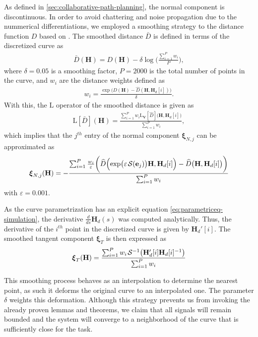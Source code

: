 As defined in \cref{sec:collaborative-path-planning}, the normal component is discontinuous. In order to avoid chattering and noise propagation due to the nummerical differentiations, we employed a smoothing strategy to the distance function $D$ based on \citet{viniciusmooth}. The smoothed distance $\bar{D}$ is defined in terms of the discretized curve as
\begin{align}
    \bar{D}(\mathbf{H}) = D(\mathbf{H}) - \delta\log\biggl(\frac{\sum_{i=1}^{P}w_i}{P}\biggr),
\end{align}
where $\delta=0.05$ is a smoothing factor, $P=\num{2000}$ is the total number of points in the curve, and $w_i$ are the distance weights defined as
\begin{align}
    w_i = \frac{\exp\bigl(D(\mathbf{H}) - \widehat{D}(\mathbf{H}, \mathbf{H}_d[i])\bigr)}{\delta}.
\end{align}
With this, the $\text{L}$ operator of the smoothed distance is given as
\begin{align}
    \text{L}[\bar{D}](\mathbf{H}) = \frac{\sum_{i=1}^{P}w_i\text{L}_\mathbf{V}[\widehat{D}]\bigl(\mathbf{H}, \mathbf{H}_d[i]\bigr)}{\sum_{i=1}^{P}w_i},
\end{align}
which implies that the $j^{th}$ entry of the normal component $\boldsymbol{\xi}_{N,j}$ can be approximated as
\begin{align}
    \boldsymbol{\xi}_{N,j}(\mathbf{H}) = -\frac{\sum_{i=1}^{P} \frac{w_i}{\varepsilon}\biggl(\widehat{D}\Bigl(\exp\bigl(\varepsilon\SL[\mathbf{e}_j]\bigr)\mathbf{H}, \mathbf{H}_d[i]\Bigr)- \widehat{D}\bigl(\mathbf{H}, \mathbf{H}_d[i]\bigr)\biggr)}{\sum_{i=1}^{P}w_i}
\end{align}
with $\varepsilon=0.001$.

As the curve parametrization has an explicit equation \eqref{eq:parametriceq-simulation}, the derivative $\frac{d}{ds}\mathbf{H}_d(s)$ was computed analytically. Thus, the derivative of the $i^{th}$ point in the discretized curve is given by $\mathbf{H}_d'[i]$. The smoothed tangent component $\boldsymbol{\xi}_T$ is then expressed as
\begin{align}
    \boldsymbol{\xi}_T(\mathbf{H}) = \frac{\sum_{i=1}^{P} w_i\invSL\bigl(\mathbf{H}_d'[i]\mathbf{H}_d[i]^{-1}\bigr)}{\sum_{i=1}^{P} w_i}
\end{align}

This smoothing process behaves as an interpolation to determine the nearest point, as such it deforms the original curve to an interpolated one. The parameter $\delta$ weights this deformation. Although this strategy prevents us from invoking the already proven lemmas and theorems, we claim that all signals will remain bounded and the system will converge to a neighborhood of the curve that is sufficiently close for the task.

